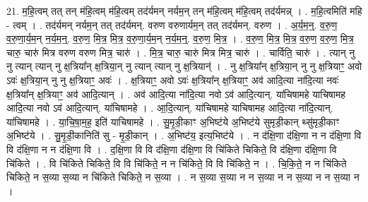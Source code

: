 \documentclass[17pt]{extarticle}
\begin{document}
21. म॒हि॒त्वम् तत् तन् म॑हि॒त्वम् म॑हि॒त्वम् तद॑र्यमन् नर्यम॒न् तन् म॑हि॒त्वम् म॑हि॒त्वम् तद॑र्यमन्न् । . म॒हि॒त्वमिति॑ महि - त्वम् । . तद॑र्यमन् नर्यम॒न् तत् तद॑र्यमन्. वरुण वरुणार्यम॒न् तत् तद॑र्यमन्. वरुण । . अ॒र्य॒म॒न्॒. व॒रु॒ण॒ व॒रु॒णा॒र्य॒म॒न् न॒र्य॒म॒न्॒. व॒रु॒ण॒ मि॒त्र॒ मि॒त्र॒ व॒रु॒णा॒र्य॒म॒न् न॒र्य॒म॒न्॒. व॒रु॒ण॒ मि॒त्र॒ । . व॒रु॒ण॒ मि॒त्र॒ मि॒त्र॒ व॒रु॒ण॒ व॒रु॒ण॒ मि॒त्र॒ चारु॒ चारु॑ मित्र वरुण वरुण मित्र॒ चारु॑ । . मि॒त्र॒ चारु॒ चारु॑ मित्र मित्र॒ चारु॑ । . चार्विति॒ चारु॑ । . त्यान् नु नु त्यान् त्यान् नु क्ष॒त्रिया᳚न् क्ष॒त्रिया॒न् नु त्यान् त्यान् नु क्ष॒त्रियान्॑ । . नु क्ष॒त्रिया᳚न् क्ष॒त्रिया॒न् नु नु क्ष॒त्रियाꣳ॒॒ अवो ऽवः॑ क्ष॒त्रिया॒न् नु नु क्ष॒त्रियाꣳ॒॒ अवः॑ । . क्ष॒त्रियाꣳ॒॒ अवो ऽवः॑ क्ष॒त्रिया᳚न् क्ष॒त्रियाꣳ॒॒ अव॑ आदि॒त्या ना॑दि॒त्या नवः॑ क्ष॒त्रिया᳚न् क्ष॒त्रियाꣳ॒॒ अव॑ आदि॒त्यान् । . अव॑ आदि॒त्या ना॑दि॒त्या नवो ऽव॑ आदि॒त्यान्. या॑चिषामहे याचिषामह आदि॒त्या नवो ऽव॑ आदि॒त्यान्. या॑चिषामहे । . आ॒दि॒त्यान्. या॑चिषामहे याचिषामह आदि॒त्या ना॑दि॒त्यान्. या॑चिषामहे । . या॒चि॒षा॒म॒ह॒ इति॑ याचिषामहे । . सु॒मृ॒डी॒काꣳ अ॒भिष्ट॑ये अ॒भिष्ट॑ये सुमृडी॒कान् थ्सु॑मृडी॒काꣳ अ॒भिष्ट॑ये । . सु॒मृ॒डी॒कानिति॑ सु - मृ॒डी॒कान् । . अ॒भिष्ट॑य॒ इत्य॒भिष्ट॑ये । . न द॑क्षि॒णा द॑क्षि॒णा न न द॑क्षि॒णा वि वि द॑क्षि॒णा न न द॑क्षि॒णा वि । . द॒क्षि॒णा वि वि द॑क्षि॒णा द॑क्षि॒णा वि चि॑किते चिकिते॒ वि द॑क्षि॒णा द॑क्षि॒णा वि चि॑किते । . वि चि॑किते चिकिते॒ वि वि चि॑किते॒ न न चि॑किते॒ वि वि चि॑किते॒ न । . चि॒कि॒ते॒ न न चि॑किते चिकिते॒ न स॒व्या स॒व्या न चि॑किते चिकिते॒ न स॒व्या । . न स॒व्या स॒व्या न न स॒व्या न न स॒व्या न न स॒व्या न । \newline
\end{document}
